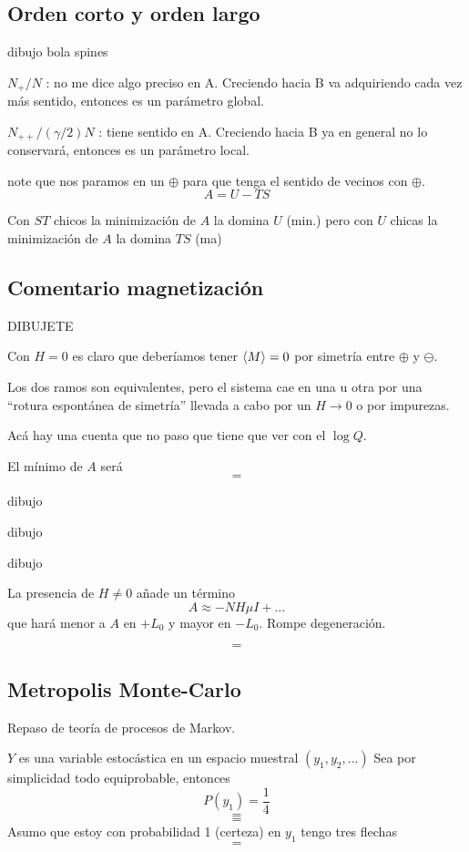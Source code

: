 \documentclass[10pt,oneside]{CBFT_book}
\begin{document}
\subsection{Orden corto y orden largo}

dibujo bola spines

$N_+ / N$ : no me dice algo preciso en A. Creciendo hacia B va adquiriendo cada vez más sentido, entonces
es un parámetro global.

$N_{++}/(\gamma/2)N$ : tiene sentido en A. Creciendo hacia B ya en general no lo conservará, entonces es
un parámetro local.

 note que nos paramos en un $\oplus$ para que tenga el sentido de
vecinos con $\oplus$.
\[
	A = U - TS
\]

Con $ST$ chicos la minimización de $A$ la domina $U$ (min.) pero con $U$ chicas la minimización de $A$ la domina
$TS$ (ma)

\subsection{Comentario magnetización}

DIBUJETE

Con $H=0$ es claro que deberíamos tener $ \braket{M}=0 $ por simetría entre $\oplus$ y $\ominus$.

Los dos ramos son equivalentes, pero el sistema cae en una u otra por una ``rotura espontánea de simetría''
llevada a cabo por un $ H \to 0 $ o por impurezas.

Acá hay una cuenta que no paso que tiene que ver con el $ \log Q $.

El mínimo de $A$ será 
\[ = \]

dibujo

dibujo

dibujo

La presencia de $ H \neq 0 $ añade un término 
\[
	A \approx - N H \mu I + ...
\]
que hará menor a $ A $ en $ + L_0 $ y mayor en $ - L_0 $. Rompe degeneración.

\[=\]

\subsection{Metropolis Monte-Carlo}

Repaso de teoría de procesos de Markov.

$Y$ es una variable estocástica en un espacio muestral $(y_1, y_2,...)$
Sea por simplicidad todo equiprobable, entonces
\[
	P(y_1) = \frac{1}{4}
\]
\[=\]
\[=\]
Asumo que estoy con probabilidad 1 (certeza) en $y_1$ tengo tres flechas
\[ = \]
\end{document}
